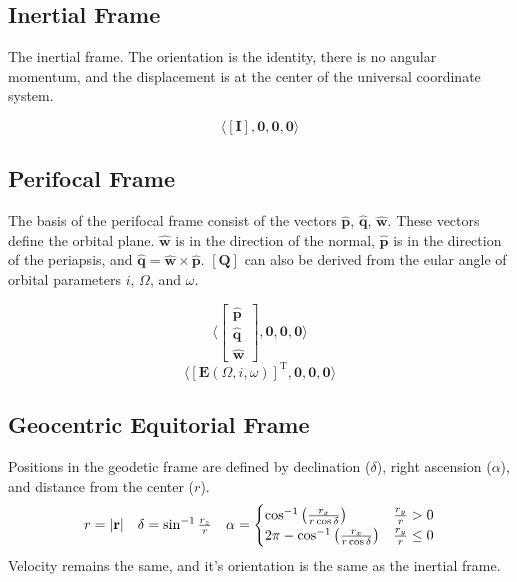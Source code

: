 \subsection{Inertial Frame}
The inertial frame. The orientation is the identity, there is no angular momentum, and the displacement is at the center of the
universal coordinate system.

\begin{equation}
    \langle \left[\mathbf{I}\right], \mathbf{0}, \mathbf{0}, \mathbf{0} \rangle
\end{equation}


\subsection{Perifocal Frame}
The basis of the perifocal frame consist of the vectors $\hat{\mathbf{p}}$, $\hat{\mathbf{q}}$, $\hat{\mathbf{w}}$. These vectors
define the orbital plane. $\hat{\mathbf{w}}$ is in the direction of the normal, $\hat{\mathbf{p}}$ is in the direction of the
periapsis, and $\hat{\mathbf{q}} = \hat{\mathbf{w}} \times \hat{\mathbf{p}}$. $\left[\mathbf{Q}\right]$ can also be derived from
the eular angle of orbital parameters $i$, $\Omega$, and $\omega$.

\begin{equation}
    \label{perifocal_pqw}
    \langle \begin{bmatrix}
        \hat{\mathbf{p}} \\
        \hat{\mathbf{q}} \\
        \hat{\mathbf{w}}
    \end{bmatrix}, \mathbf{0}, \mathbf{0}, \mathbf{0} \rangle
\end{equation}
\begin{equation}
    \label{perifocal_iWw}
    \langle \left[\mathbf{E}\left(\Omega,i,\omega\right)\right]^{\mathrm{T}}, \mathbf{0}, \mathbf{0}, \mathbf{0} \rangle
\end{equation}

\subsection{Geocentric Equitorial Frame}
Positions in the geodetic frame are defined by declination ($\delta$), right ascension ($\alpha$), and distance from the center ($r$).
\begin{equation}
    \begin{array}{c c c}
        r = |\mathbf{r}| &
        \delta = \sin^{-1}{\frac{r_z}{r}} &
        \alpha =
        \begin{cases}
            \cos^{-1}{\left(\frac{r_x}{r\cos{\delta}}\right)} & \frac{r_y}{r} > 0 \\
            2\pi-\cos^{-1}{\left(\frac{r_x}{r\cos{\delta}}\right)} & \frac{r_y}{r} \leq 0
        \end{cases}
    \end{array}
\end{equation}
Velocity remains the same, and it's orientation is the same as the inertial frame.

